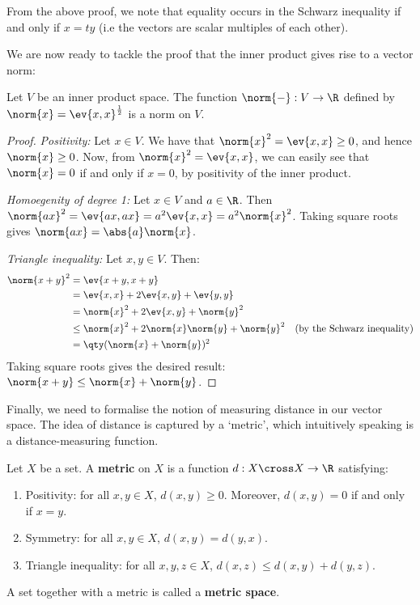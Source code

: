 From the above proof, we note that equality occurs in the Schwarz inequality if and only if \( x=ty \) (i.e the vectors are scalar multiples of each other).

\vspace{3mm}

We are now ready to tackle the proof that the inner product gives rise to a vector norm:

\begin{theorem}
  Let \( V \) be an inner product space. The function \( \norm{-}:V\to\R \) defined by \( \norm{x}=\ev{x,x}^{\frac{1}{2}} \) is a norm on \( V \).
\end{theorem}
\begin{proof}
  \emph{Positivity:} Let \( x\in V \). We have that \( \norm{x}^2=\ev{x,x}\geq 0 \), and hence \( \norm{x}\geq 0 \). Now, from \( \norm{x}^2=\ev{x,x} \), we can easily see that \( \norm{x}=0 \) if and only if \( x=0 \), by positivity of the inner product.

  \vspace{3mm}

  \emph{Homoegenity of degree 1:} Let \( x\in V \) and \( a\in\R \). Then \( \norm{ax}^2=\ev{ax,ax}=a^2\ev{x,x}=a^2\norm{x}^2 \). Taking square roots gives \( \norm{ax}=\abs{a}\norm{x} \).

  \vspace{3mm}

  \emph{Triangle inequality:} Let \( x,y\in V \). Then:
  \begin{align*}
    \norm{x+y}^2&= \ev{x+y,x+y}\\
    &= \ev{x,x}+2\ev{x,y}+\ev{y,y}\\
    &= \norm{x}^2+2\ev{x,y}+\norm{y}^2\\
    &\leq \norm{x}^2+2\norm{x}\norm{y}+\norm{y}^2 &(\text{by the Schwarz inequality})\\
    &= \qty(\norm{x}+\norm{y})^2
  \end{align*}
  Taking square roots gives the desired result: \( \norm{x+y}\leq\norm{x}+\norm{y} \).
\end{proof}

Finally, we need to formalise the notion of measuring distance in our vector space. The idea of distance is captured by a `metric', which intuitively speaking is a distance-measuring function.

\begin{definition}
  Let \( X \) be a set. A \textbf{metric} on \( X \) is a function \( d:X\cross X\to\R \) satisfying:
  \begin{enumerate}[label=(\alph*)]
  \item Positivity: for all \( x,y\in X \), \( d(x,y)\geq 0 \). Moreover, \( d(x,y)=0 \) if and only if \( x=y \).
  \item Symmetry: for all \( x,y\in X\), \( d(x,y)=d(y,x) \).
  \item Triangle inequality: for all \( x,y,z\in X \), \( d(x,z)\leq d(x,y)+d(y,z) \).
  \end{enumerate}
  A set together with a metric is called a \textbf{metric space}.
\end{definition}

